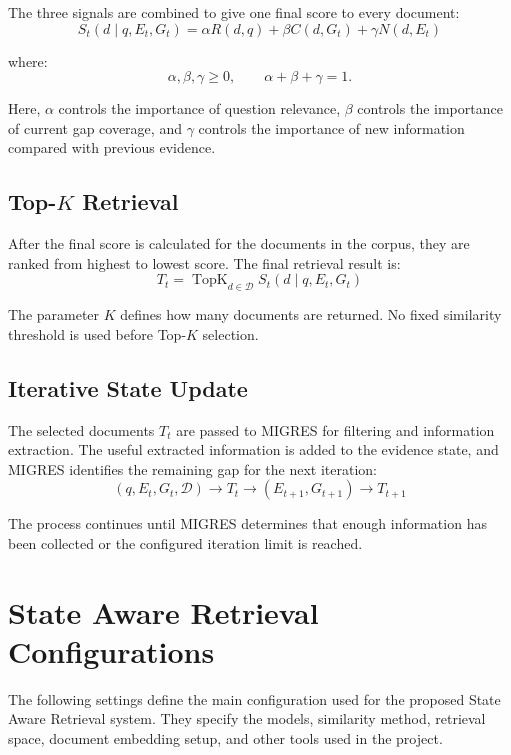 \documentclass[12pt,a4paper]{report}
\begin{document}
The three signals are combined to give one final score to every document:
\[
\boxed{
S_t(d\mid q,E_t,G_t)=
\alpha R(d,q)+\beta C(d,G_t)+\gamma N(d,E_t)
}
\tag{7}
\]

where:
\[
\boxed{
\alpha,\beta,\gamma\geq0,
\qquad
\alpha+\beta+\gamma=1.
}
\tag{8}
\]

Here, $\alpha$ controls the importance of question relevance, $\beta$ controls the importance of current gap coverage, and $\gamma$ controls the importance of new information compared with previous evidence.

\subsection{Top-$K$ Retrieval}

After the final score is calculated for the documents in the corpus, they are ranked from highest to lowest score. The final retrieval result is:
\[
\boxed{
T_t=\operatorname{TopK}_{d\in\mathcal{D}} S_t(d\mid q,E_t,G_t)
}
\tag{9}
\]

The parameter $K$ defines how many documents are returned. No fixed similarity threshold is used before Top-$K$ selection.

\subsection{Iterative State Update}

The selected documents $T_t$ are passed to MIGRES for filtering and information extraction. The useful extracted information is added to the evidence state, and MIGRES identifies the remaining gap for the next iteration:
\[
\boxed{
(q,E_t,G_t,\mathcal{D})
\rightarrow
T_t
\rightarrow
(E_{t+1},G_{t+1})
\rightarrow
T_{t+1}
}
\tag{10}
\]

The process continues until MIGRES determines that enough information has been collected or the configured iteration limit is reached.
\clearpage

\section{State Aware Retrieval Configurations}

The following settings define the main configuration used for the proposed State Aware Retrieval system. They specify the models, similarity method, retrieval space, document embedding setup, and other tools used in the project.
\end{document}
